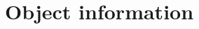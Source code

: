 \documentclass[Orbiter User Manual.tex]{subfiles}
\begin{document}
\section{Object information}

\end{document}
